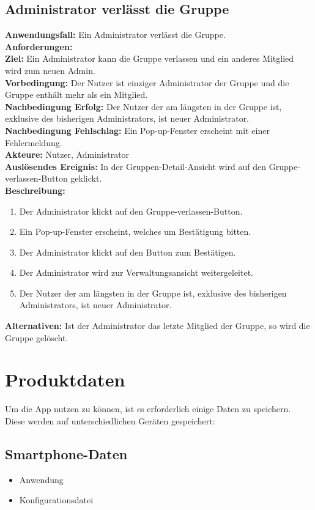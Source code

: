 \documentclass[parskip=full]{scrartcl}
\newcommand{\changelocaltocdepth}[1]{%
  \addtocontents{toc}{\protect\setcounter{tocdepth}{#1}}%
  \setcounter{tocdepth}{#1}%
}
\newcommand{\enablesubsectionnumbering}[1]{
    \renewcommand{\thesubsection}{$\langle$#1\arabic{subsection}0$\rangle$}
    \changelocaltocdepth{1} 
}
\newcommand{\resetsubsectionnumbering}{
    \renewcommand{\thesubsection}{\arabic{section}.\arabic{subsection}}
    \changelocaltocdepth{3} 
}
\begin{document}
\subsection{Administrator verlässt die Gruppe}
\textbf{Anwendungsfall:} Ein Administrator verlässt die Gruppe.\\
\textbf{Anforderungen:} \\
\textbf{Ziel:} Ein Administrator kann die Gruppe verlassen und ein anderes Mitglied wird zum neuen Admin.\\
\textbf{Vorbedingung:} Der Nutzer ist einziger Administrator der Gruppe und die Gruppe enthält mehr als ein Mitglied.\\
\textbf{Nachbedingung Erfolg:} Der Nutzer der am längsten in der Gruppe ist, exklusive des bisherigen Administrators, ist neuer Administrator.\\
\textbf{Nachbedingung Fehlschlag:} Ein Pop-up-Fenster erscheint mit einer Fehlermeldung.\\
\textbf{Akteure:} Nutzer, Administrator\\
\textbf{Auslösendes Ereignis:} In der Gruppen-Detail-Ansicht wird auf den Gruppe-verlassen-Button geklickt.\\
\textbf{Beschreibung:}
\begin{enumerate}
    \item Der Administrator klickt auf den Gruppe-verlassen-Button.
    \item Ein Pop-up-Fenster erscheint, welches um Bestätigung bitten.
    \item Der Administrator klickt auf den Button zum Bestätigen.
    \item Der Administrator wird zur Verwaltungsansicht weitergeleitet.
    \item Der Nutzer der am längsten in der Gruppe ist, exklusive des bisherigen Administrators, ist neuer Administrator. 
\end{enumerate}
\textbf{Alternativen:} Ist der Administrator das letzte Mitglied der Gruppe, so wird die Gruppe gelöscht.
\newpage


\resetsubsectionnumbering


\section{Produktdaten}
\enablesubsectionnumbering{D}
Um die App nutzen zu können, ist es erforderlich einige Daten zu speichern. Diese werden auf unterschiedlichen Geräten gespeichert:

\subsection{Smartphone-Daten}
\begin{itemize}
    \item Anwendung
    \item Konfigurationsdatei
\end{itemize}
\end{document}
